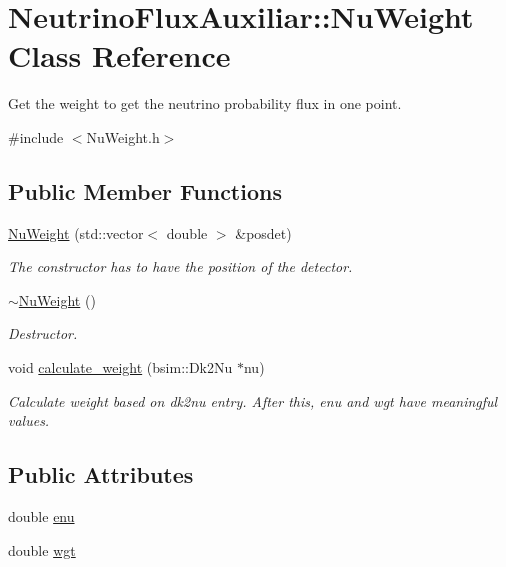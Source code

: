 \hypertarget{class_neutrino_flux_auxiliar_1_1_nu_weight}{\section{Neutrino\-Flux\-Auxiliar\-:\-:Nu\-Weight Class Reference}
\label{class_neutrino_flux_auxiliar_1_1_nu_weight}
}


Get the weight to get the neutrino probability flux in one point.  




{\ttfamily \#include $<$Nu\-Weight.\-h$>$}

\subsection*{Public Member Functions}
\begin{DoxyCompactItemize}
\item 
\hyperlink{class_neutrino_flux_auxiliar_1_1_nu_weight_a8b1c902f732e7be8d3591e74c807fb3c}{Nu\-Weight} (std\-::vector$<$ double $>$ \&posdet)
\begin{DoxyCompactList}\small\item\em The constructor has to have the position of the detector. \end{DoxyCompactList}\item 
\hyperlink{class_neutrino_flux_auxiliar_1_1_nu_weight_a1ee7ff5745a68e9595751fd4f16b66ec}{$\sim$\-Nu\-Weight} ()
\begin{DoxyCompactList}\small\item\em Destructor. \end{DoxyCompactList}\item 
void \hyperlink{class_neutrino_flux_auxiliar_1_1_nu_weight_ac6b650be51f799539e2f5ddddf3256ba}{calculate\-\_\-weight} (bsim\-::\-Dk2\-Nu $\ast$nu)
\begin{DoxyCompactList}\small\item\em Calculate weight based on dk2nu entry. After this, enu and wgt have meaningful values. \end{DoxyCompactList}\end{DoxyCompactItemize}
\subsection*{Public Attributes}
\begin{DoxyCompactItemize}
\item 
double \hyperlink{class_neutrino_flux_auxiliar_1_1_nu_weight_aaf30ef23c7cf98ecbda310a777d0b8aa}{enu}
\item 
double \hyperlink{class_neutrino_flux_auxiliar_1_1_nu_weight_a53e3e4d489356d71c6493e9e4ae11250}{wgt}
\end{DoxyCompactItemize}

